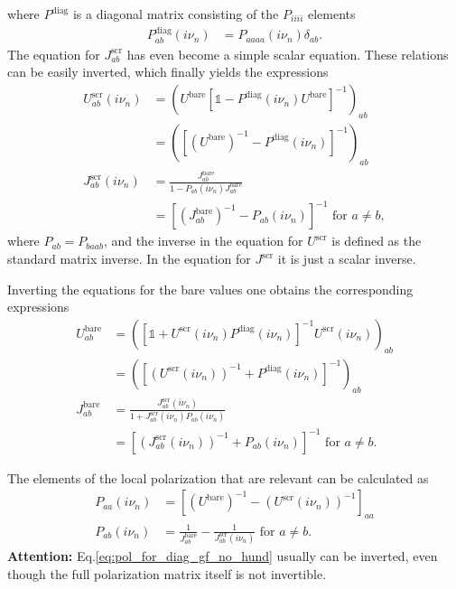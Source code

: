 \documentclass[12pt,a4paper]{scrartcl}
\numberwithin{equation}{section}
\newcommand{\unity}{\mathds{1}}
\begin{document}
where $P^{\mathrm{diag}}$ is a diagonal matrix consisting of the $P_{iiii}$ elements 
\begin{align}
 P^{\mathrm{diag}}_{ab}(i\nu_n) &=  P_{aaaa}(i\nu_n) \delta_{ab}.
\end{align}
The equation for $J^{\mathrm{scr}}_{ab}$ has even become a simple scalar equation.
These relations can be easily inverted, which finally yields the expressions
\begin{align}
 U^{\mathrm{scr}}_{ab}(i\nu_n) 
 &= \left( U^{\mathrm{bare}} \left[\unity -  P^{\mathrm{diag}}(i\nu_n) U^{\mathrm{bare}} \right]^{-1} \right)_{ab} \\
 &=  \left( \left[ \left(U^{\mathrm{bare}}\right)^{-1} -  P^{\mathrm{diag}}(i\nu_n) \right]^{-1} \right)_{ab} \\
 J^{\mathrm{scr}}_{ab}(i\nu_n) 
 &= \frac{ J^{\mathrm{bare}}_{ab} }{ 1 - P_{ab}(i\nu_n)J^{\mathrm{bare}}_{ab} }  \\
 &= \left[  \left(J^{\mathrm{bare}}_{ab} \right)^{-1} - P_{ab}(i\nu_n) \right]^{-1} \mbox{ for } a\neq b,
\end{align}
where  $P_{ab} = P_{baab}$, and the inverse in the equation for $U^{\mathrm{scr}}$
is defined as the standard matrix inverse. In the equation for $J^{\mathrm{scr}}$ it is just 
a scalar inverse.

Inverting the equations for the bare values one obtains the corresponding expressions
\begin{align}
 U^{\mathrm{bare}}_{ab}
 &= \left( \left[\unity + U^{\mathrm{scr}}(i\nu_n) P^{\mathrm{diag}}(i\nu_n) \right]^{-1} U^{\mathrm{scr}}(i\nu_n) \right)_{ab} \\
 &=  \left( \left[ \left(U^{\mathrm{scr}}(i\nu_n)\right)^{-1} +  P^{\mathrm{diag}}(i\nu_n) \right]^{-1} \right)_{ab} \\
 J^{\mathrm{bare}}_{ab} 
 &= \frac{ J^{\mathrm{scr}}_{ab}(i\nu_n) }{ 1 + J^{\mathrm{scr}}_{ab}(i\nu_n) P_{ab}(i\nu_n) } \\
 &= \left[  \left(J^{\mathrm{scr}}_{ab}(i\nu_n) \right)^{-1} + P_{ab}(i\nu_n) \right]^{-1} \mbox{ for } a\neq b.
\end{align}

The elements of the local polarization that are relevant can be 
calculated as
\begin{align}
 P_{aa}(i\nu_n)  
 &= \left[ \left(U^{\mathrm{bare}}\right)^{-1} - \left(U^{\mathrm{scr}}(i\nu_n)\right)^{-1} \right]_{aa} 
 \label{eq:pol_for_diag_gf_no_hund} \\
%
 P_{ab}(i\nu_n) 
 &= \frac{1}{J^{\mathrm{bare}}_{ab}} - \frac{1}{J^{\mathrm{scr}}_{ab}(i\nu_n)} \mbox{ for } a\neq b.
\end{align}
\textbf{Attention:} Eq.\eqref{eq:pol_for_diag_gf_no_hund} usually can be inverted, even though
the full polarization matrix itself is not invertible.
\end{document}
